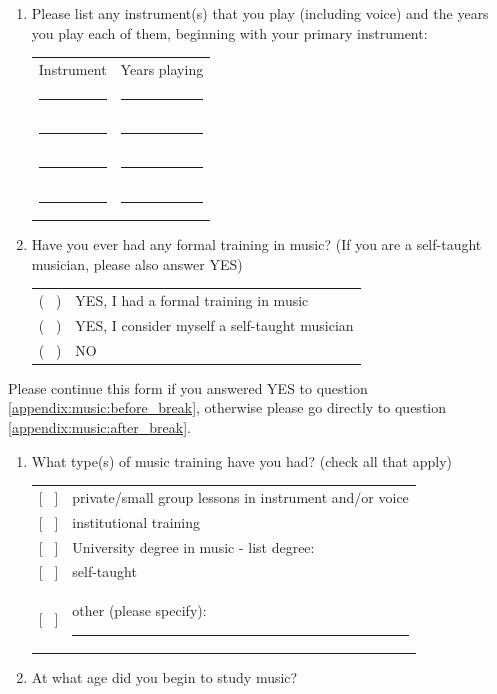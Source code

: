 \documentclass[a4paper,11pt]{article}
\newcommand{\myunderline}{\rule{2in}{.5pt}}
\begin{document}
{\begin{appendices}
\begin{enumerate}[resume]
	\myunderline \ years

	\item Please list any instrument(s) that you play (including voice) and the years you play each of them, beginning with your primary instrument:

	\begin{tabular}{c c}
		Instrument &  Years playing \\
		\myunderline & \myunderline \\
		\myunderline & \myunderline \\
		\myunderline & \myunderline \\
		\myunderline & \myunderline \\
	\end{tabular}
	
	\item \label{appendix:music:before_break}Have you ever had any formal training in music? (If you are a self-taught musician, please also answer YES)

	\begin{tabular}{l l}
		( \ ) & YES, I had a formal training in music \\
		( \ ) & YES, I consider myself a self-taught musician \\
		( \ ) & NO \\
	\end{tabular}

\end{enumerate}
Please continue this form if you answered YES to question \ref{appendix:music:before_break}, otherwise please go directly to question \ref{appendix:music:after_break}.
\begin{enumerate}[resume]

	\item What type(s) of music training have you had? (check all that apply)

	\begin{tabular}{l l}
		{[{ \ }]} & private/small group lessons in instrument and/or voice \\
		{[{ \ }]} & institutional training \\
		{[{ \ }]} & University degree in music - list degree: \\
		{[{ \ }]} & self-taught \\
		{[{ \ }]} & other (please specify): \myunderline \\
	\end{tabular}

 	\item At what age did you begin to study music?


\end{enumerate}
\end{appendices}}
\end{document}
